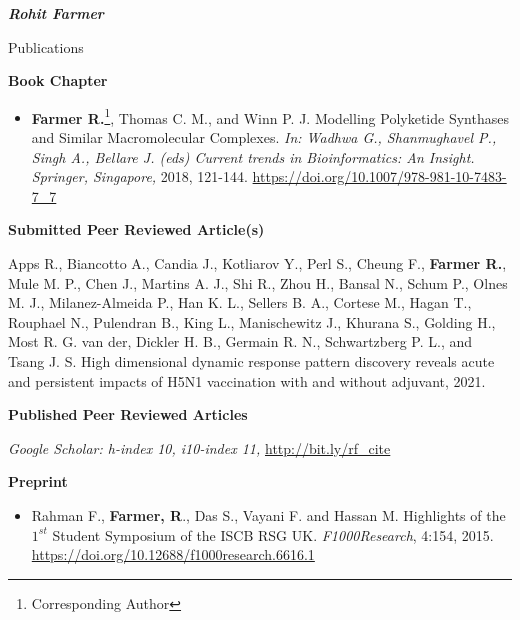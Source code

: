 \documentclass[10pt]{article}
\begin{document}
\begin{cv}{\huge \it \bfseries Rohit Farmer}
\begin{cvlist}{Publications}
\vskip3pt
\item {\textbf{Book Chapter}}
\item {\begin{itemize}\item{\bf Farmer R.}\footnote{Corresponding Author}, Thomas C. M., and Winn P. J. Modelling Polyketide Synthases and Similar Macromolecular Complexes. \emph{In: Wadhwa G., Shanmughavel P., Singh A., Bellare J. (eds) Current trends in Bioinformatics: An Insight. Springer, Singapore,} 2018, 121-144. \url{https://doi.org/10.1007/978-981-10-7483-7_7} \end{itemize}}

\vskip3pt
\item {\textbf{Submitted Peer Reviewed Article(s)}}
\item {\begin{itemize}Apps R., Biancotto A., Candia J., Kotliarov Y., Perl S., Cheung F., \textbf{Farmer R.}, Mule M. P., Chen J., Martins A. J., Shi R., Zhou H., Bansal N., Schum P., Olnes M. J., Milanez-Almeida P., Han K. L., Sellers B. A., Cortese M., Hagan T., Rouphael N., Pulendran B., King L., Manischewitz J., Khurana S., Golding H., Most R. G. van der, Dickler H. B., Germain R. N., Schwartzberg P. L., and Tsang J. S. High dimensional dynamic response pattern discovery reveals acute and persistent impacts of H5N1 vaccination with and without adjuvant, 2021. \end{itemize}}

\vskip3pt
\item {\bf Published Peer Reviewed Articles}
\item {\textit{Google Scholar: h-index 10, i10-index 11,} \url{http://bit.ly/rf_cite}}
\vskip3pt
\item{ }

\vskip3pt
\item {\textbf{Preprint}}
\item {\begin{itemize}\item Rahman F., \textbf{Farmer, R}., Das S., Vayani F. and Hassan M. Highlights of the $1^{st}$ Student Symposium of the ISCB RSG UK. \emph{F1000Research}, 4:154, 2015. \url{https://doi.org/10.12688/f1000research.6616.1} \end{itemize}}

\end{cvlist}
\end{cv}
\end{document}
